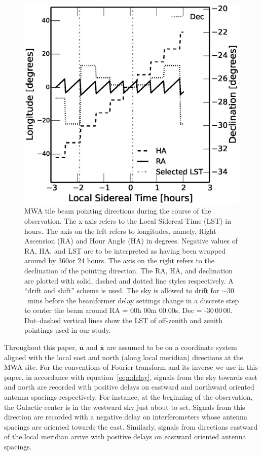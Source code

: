 \documentclass[preprint2,iop,numberedappendix]{emulateapj}
\begin{document}
\begin{figure}[htb]
\centering
\includegraphics[width=\linewidth]{figures/v1_0/custom_pointings.eps}
\caption{MWA tile beam pointing directions during the course of the observation. The x-axis refers to the Local Sidereal Time (LST) in hours. The axis on the left refers to longitudes, namely, Right Ascension (RA) and Hour Angle (HA) in degrees. Negative values of RA, HA, and LST are to be interpreted as having been wrapped around by 360\arcdeg or 24 hours. The axis on the right refers to the declination of the pointing direction. The RA, HA, and declination are plotted with solid, dashed and dotted line styles respectively. A ``drift and shift'' scheme is used. The sky is allowed to drift for $\sim 30$~mins before the beamformer delay settings change in a discrete step to center the beam around RA = 00h 00m 00.00s, Dec = -30\arcdeg$\,$00\arcmin$\,$00. Dot--dashed vertical lines show the LST of off-zenith and zenith pointings used in our study. \label{fig:pointings}}
\end{figure}

Throughout this paper, $\overline{\mathbf{u}}$ and $\overline{\mathbf{x}}$ are assumed to be on a coordinate system aligned with the local east and north (along local meridian) directions at the MWA site. For the conventions of Fourier transform and its inverse we use in this paper, in accordance with equation~\ref{eqn:delay}, signals from the sky towards east and north are recorded with positive delays on eastward and northward oriented antenna spacings respectively. For instance, at the beginning of the observation, the Galactic center is in the westward sky just about to set. Signals from this direction are recorded with a negative delay on interferometers whose antenna spacings are oriented towards the east. Similarly, signals from directions eastward of the local meridian arrive with positive delays on eastward oriented antenna spacings. 
\end{document}

